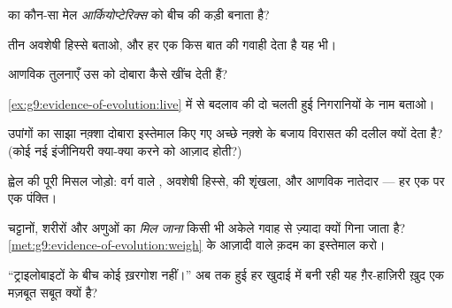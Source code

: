 \begin{exercise}[$\star$]\label{exo:g9:evidence-of-evolution:3}
 का कौन-सा मेल \emph{आर्कियोप्टेरिक्स} को बीच की कड़ी बनाता है?
\end{exercise}

\begin{exercise}[$\star$]\label{exo:g9:evidence-of-evolution:4}
तीन अवशेषी हिस्से बताओ, और हर एक किस बात की गवाही देता है यह भी।
\end{exercise}

\begin{exercise}[$\star$]\label{exo:g9:evidence-of-evolution:5}
आणविक तुलनाएँ उस  को दोबारा कैसे खींच देती हैं?
\end{exercise}

\begin{exercise}[$\star$]\label{exo:g9:evidence-of-evolution:6}
\cref{ex:g9:evidence-of-evolution:live} में से बदलाव की दो चलती हुई
निगरानियों के नाम बताओ।
\end{exercise}

\begin{exercise}[$\star\star$]\label{exo:g9:evidence-of-evolution:7}
उपांगों का साझा नक़्शा दोबारा इस्तेमाल किए गए अच्छे नक़्शे के बजाय विरासत
की दलील क्यों देता है? (कोई नई इंजीनियरी क्या-क्या करने को आज़ाद होती?)
\end{exercise}

\begin{exercise}[$\star\star$]\label{exo:g9:evidence-of-evolution:8}
ह्वेल की पूरी मिसल जोड़ो: वर्ग वाले , अवशेषी हिस्से,  की
शृंखला, और आणविक नातेदार --- हर एक पर एक पंक्ति।
\end{exercise}

\begin{exercise}[$\star\star$]\label{exo:g9:evidence-of-evolution:9}
चट्टानों, शरीरों और अणुओं का \emph{मिल जाना} किसी भी अकेले गवाह से
ज़्यादा क्यों गिना जाता है?
\cref{met:g9:evidence-of-evolution:weigh} के आज़ादी वाले क़दम का
इस्तेमाल करो।
\end{exercise}

\begin{exercise}[$\star\star$]\label{exo:g9:evidence-of-evolution:10}
``ट्राइलोबाइटों के बीच कोई ख़रगोश नहीं।'' अब तक हुई हर खुदाई में बनी रही
यह ग़ैर-हाज़िरी ख़ुद एक मज़बूत सबूत क्यों है?
\end{exercise}

